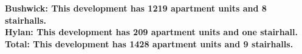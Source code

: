 \bf{Bushwick}: This development has 1219 apartment units and 8 stairhalls.\\\bf{Hylan}: This development has 209 apartment units and one stairhall.\\\bf{Total}: This development has 1428 apartment units and 9 stairhalls.\\